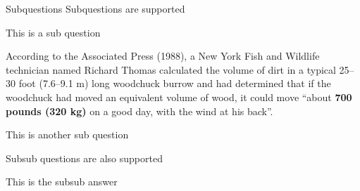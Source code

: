 \documentclass[11pt]{article}
\begin{document}
\begin{question}{Subquestions}
  Subquestions are supported

  \begin{subquestion}[10\%]{This is a sub question}
    \begin{subanswer}
      According to the Associated Press (1988), a New York Fish and Wildlife technician named Richard Thomas calculated the volume of dirt in a typical 25--30 foot (7.6--9.1 m) long woodchuck burrow and had determined that if the woodchuck had moved an equivalent volume of wood, it could move ``about \textbf{700 pounds (320 kg)} on a good day, with the wind at his back''.
    \end{subanswer}
  \end{subquestion}

  \begin{subquestion}{This is another sub question}
    \begin{subsubquestion}{}
      Subsub questions are also supported
      \begin{subsubanswer}
        This is the subsub answer
      \end{subsubanswer}
    \end{subsubquestion}
  \end{subquestion}

\end{question}
\end{document}
